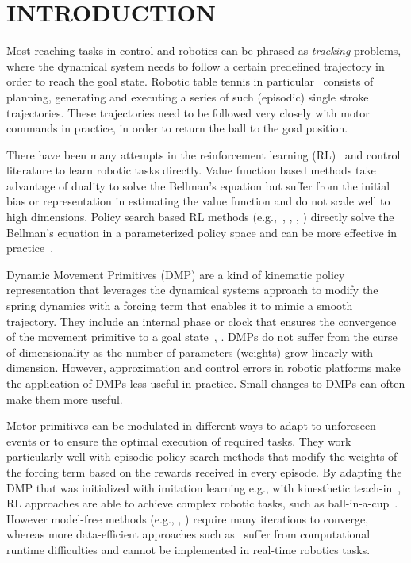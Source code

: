 \section{INTRODUCTION}\label{introduction}


Most reaching tasks in control and robotics can be phrased as \emph{tracking} problems, where the dynamical system needs to follow a certain predefined trajectory in order to reach the goal state. Robotic table tennis in particular~\cite{Muelling13} consists of planning, generating and executing a series of such (episodic) single stroke trajectories. These trajectories need to be followed very closely with motor commands in practice, in order to return the ball to the goal position. 

There have been many attempts in the reinforcement learning (RL)~\cite{Sutton98} and control literature to learn robotic tasks directly. Value function based methods take advantage of duality to solve the Bellman's equation but suffer from the initial bias or representation in estimating the value function and do not scale well to high dimensions. Policy search based RL methods (e.g.,~\cite{Kober08}, \cite{Peter10}, \cite{Theodorou10}, \cite{Deisenroth11}) directly solve the Bellman's equation in a parameterized policy space and can be more effective in practice~\cite{Kober13}. 

Dynamic Movement Primitives (DMP) are a kind of kinematic policy representation that leverages the dynamical systems approach to modify the spring dynamics with a forcing term that enables it to mimic a smooth trajectory. They include an internal phase or clock that ensures the convergence of the movement primitive to a goal state~\cite{Ijspeert13}, \cite{Schaal07}. DMPs do not suffer from the curse of dimensionality as the number of parameters (weights) grow linearly with dimension. However, approximation and control errors in robotic platforms make the application of DMPs less useful in practice. Small changes to DMPs can often make them more useful.

Motor primitives can be modulated in different ways to adapt to unforeseen events or to ensure the optimal execution of required tasks. They work particularly well with episodic policy search methods that modify the weights of the forcing term based on the rewards received in every episode. By adapting the DMP that was initialized with imitation learning e.g., with kinesthetic teach-in~\cite{Muelling13}, RL approaches are able to achieve complex robotic tasks, such as ball-in-a-cup~\cite{Kober09}. However model-free methods (e.g., \cite{Kober08}, \cite{Peter10}) require many iterations to converge, whereas more data-efficient approaches such as~\cite{Deisenroth11} suffer from computational runtime difficulties and cannot be implemented in real-time robotics tasks. %

